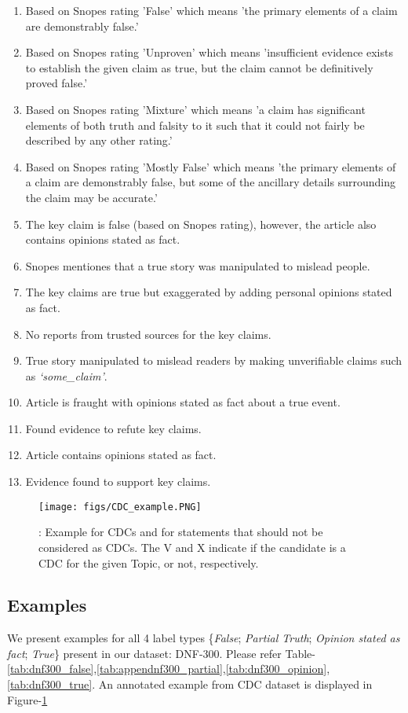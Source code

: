 \documentclass[11pt,a4paper]{article}
\begin{document}
\begin{enumerate}[nolistsep]
	\item Based on Snopes rating 'False' which means 'the primary elements of a claim are demonstrably false.'  
	\item Based on Snopes rating 'Unproven' which means 'insufficient evidence exists to establish the given claim as true, but the claim cannot be definitively proved false.'
	\item Based on Snopes rating 'Mixture' which means 'a claim has significant elements of both truth and falsity to it such that it could not fairly be described by any other rating.'
	\item Based on Snopes rating 'Mostly False' which means 'the primary elements of a claim are demonstrably false, but some of the ancillary details surrounding the claim may be accurate.'
	\item The key claim is false (based on Snopes rating), however, the article also contains opinions stated as fact.
	\item Snopes mentiones that a true story was manipulated to mislead people.
	\item The key claims are true but exaggerated by adding personal opinions stated as fact.
	\item No reports from trusted sources for the key claims.
	\item True story manipulated to mislead readers by making unverifiable claims such as \textit{`some\_claim'}.
	\item Article is fraught with opinions stated as fact about a true event.
	\item Found evidence to refute key claims.
	\item Article contains opinions stated as fact.
	\item Evidence found to support key claims.
\end{enumerate}

\begin{figure}[ht]
\begin{center}
\texttt{[image: figs/CDC\_example.PNG]}
\caption{\label{fig:cdc_eg}: Example for CDCs and for statements that should not be considered as CDCs. The V and X indicate if the candidate is a CDC for the given Topic, or not, respectively.}
\end{center}
\end{figure}

\subsection{Examples}
\label{sect:example}
We present examples for all 4 label types \{\textit{False}; \textit{Partial Truth}; \textit{Opinion stated as fact}; \textit{True}\} present in our dataset: DNF-300. Please refer Table-\ref{tab:dnf300_false},\ref{tab:appendnf300_partial},\ref{tab:dnf300_opinion},\ref{tab:dnf300_true}. An annotated example from CDC dataset is displayed in Figure-\ref{fig:cdc_eg}
\end{document}

